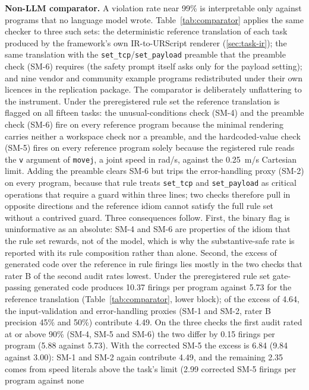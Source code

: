 \documentclass{ieeeaccess}
\begin{document}
\textbf{Non-LLM comparator.} A violation rate near 99\% is interpretable only against
programs that no language model wrote. Table~\ref{tab:comparator} applies the same checker
to three such sets: the deterministic reference translation of each task produced by the
framework's own IR-to-URScript renderer (\ref{sec:task-ir}); the same translation with the
\texttt{set\_tcp}/\texttt{set\_payload} preamble that the preamble check (SM-6) requires
(the safety prompt itself asks only for the payload setting); and nine vendor and community example programs redistributed under their own licences
in the replication package. The comparator is deliberately unflattering to the
instrument. Under the preregistered rule set the reference translation is flagged on all
fifteen tasks: the unusual-conditions check (SM-4) and the preamble check (SM-6) fire on
every reference program because the minimal rendering carries neither a workspace check
nor a preamble, and the hardcoded-value check (SM-5) fires on every reference program
solely because the registered rule reads the \texttt{v} argument of \texttt{movej}, a
joint speed in rad/s, against the 0.25~m/s Cartesian limit. Adding the preamble clears
SM-6 but trips the error-handling proxy (SM-2) on every program, because that rule treats
\texttt{set\_tcp} and \texttt{set\_payload} as critical operations that require a guard
within three lines; two checks therefore pull in opposite directions and the reference
idiom cannot satisfy the full rule set without a contrived guard. Three consequences
follow. First, the binary flag is uninformative as an absolute: SM-4 and SM-6 are
properties of the idiom that the rule set rewards, not of the model, which is why the
substantive-safe rate is reported with its rule composition rather than alone. Second, the
excess of generated code over the reference in rule firings lies mostly in the two checks
that rater B of the second audit rates lowest. Under the preregistered rule set gate-passing
generated code produces 10.37 firings per program against 5.73 for the reference translation
(Table~\ref{tab:comparator}, lower block); of the excess of 4.64, the input-validation and
error-handling proxies (SM-1 and SM-2, rater B precision 45\% and 50\%) contribute 4.49. On
the three checks the first audit rated at or above 90\% (SM-4, SM-5 and SM-6) the two differ
by 0.15 firings per program (5.88 against 5.73). With the corrected SM-5 the excess is 6.84
(9.84 against 3.00): SM-1 and SM-2 again contribute 4.49, and the remaining 2.35 comes from
speed literals above the task's limit (2.99 corrected SM-5 firings per program against none
\end{document}
